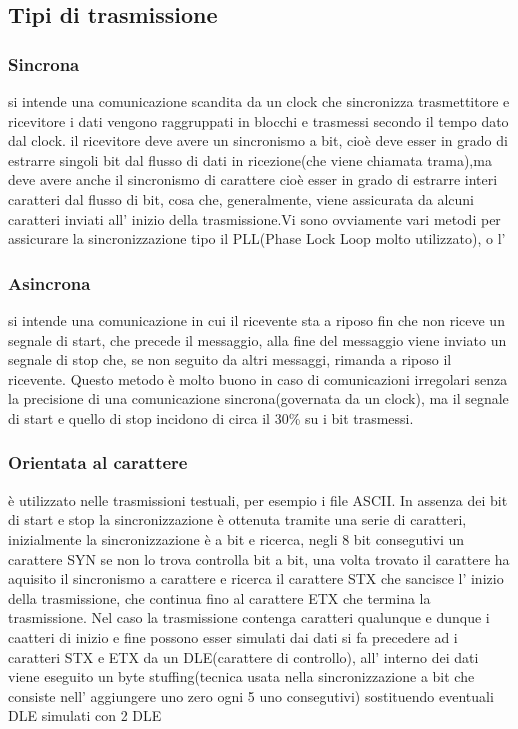 \documentclass[a4paper,11pt]{article}
\def\sub#1{\subsection{#1}\label{#1}}
\def\subsub#1{\subsubsection{#1}\label{#1}}
\def\vedi#1{\nameref{#1}}
\begin{document}
\sub{Tipi di trasmissione}
\subsub{Sincrona}
si intende una comunicazione scandita da un clock che sincronizza trasmettitore e ricevitore i dati vengono raggruppati in blocchi e trasmessi secondo il tempo dato dal clock. il ricevitore deve avere un sincronismo a bit, cioè deve esser in grado di estrarre singoli bit dal flusso di dati in ricezione(che viene chiamata trama),ma deve avere anche il sincronismo di carattere cioè esser in grado di estrarre interi caratteri dal flusso di bit, cosa che, generalmente, viene assicurata da
alcuni caratteri inviati all' inizio della trasmissione.Vi sono ovviamente vari metodi per assicurare la sincronizzazione tipo il PLL(Phase Lock Loop molto utilizzato), o l' \vedi{AMI(Alternative Mark Inversion)}
\subsub{Asincrona}
si intende una comunicazione in cui il ricevente sta a riposo fin che non riceve un segnale di start, che precede il messaggio,
alla fine del messaggio viene inviato un segnale di stop che, se non seguito da altri messaggi, rimanda a riposo il ricevente.
Questo metodo è molto buono in caso di comunicazioni irregolari senza la precisione di una comunicazione sincrona(governata da un clock), ma il segnale di start e quello di stop incidono di circa il 30\% su i bit trasmessi.  
\subsub{Orientata al carattere}
è utilizzato nelle trasmissioni testuali, per esempio i file ASCII. In assenza dei bit di start e stop la sincronizzazione è ottenuta tramite una serie di caratteri, inizialmente la sincronizzazione è a bit e ricerca, negli 8 bit consegutivi un carattere SYN se non lo trova controlla bit a bit, una volta trovato il carattere ha aquisito il sincronismo a carattere e ricerca il carattere STX che sancisce l' inizio della trasmissione, che continua fino al carattere ETX che termina la
trasmissione. Nel caso la trasmissione contenga caratteri qualunque e dunque i caatteri di inizio e fine possono esser simulati dai dati si fa precedere ad i caratteri STX e ETX da un DLE(carattere di controllo), all' interno dei dati viene eseguito un byte stuffing(tecnica usata nella sincronizzazione a bit che consiste nell' aggiungere uno zero ogni 5 uno consegutivi) sostituendo eventuali DLE simulati con 2 DLE   
\end{document}
